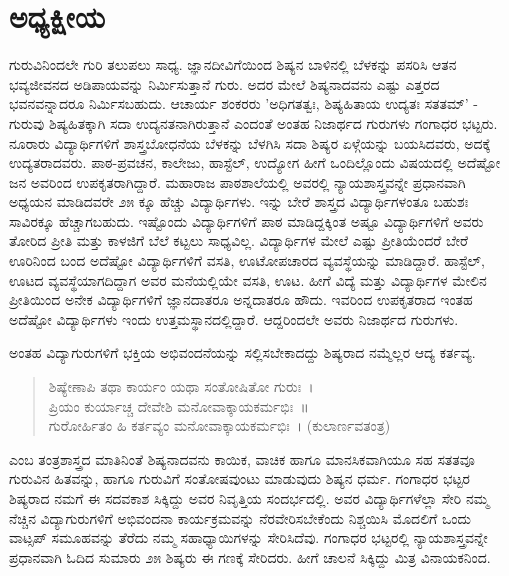 {\fontsize{14}{16}\selectfont
\chapter{ಅಧ್ಯಕ್ಷೀಯ}

ಗುರುವಿನಿಂದಲೇ ಗುರಿ ತಲುಪಲು ಸಾಧ್ಯ. ಜ್ಞಾನದೀವಿಗೆಯಿಂದ ಶಿಷ್ಯನ ಬಾಳಿನಲ್ಲಿ ಬೆಳಕನ್ನು ಪಸರಿಸಿ ಆತನ ಭವ್ಯಜೀವನದ ಅಡಿಪಾಯವನ್ನು ನಿರ್ಮಿಸುತ್ತಾನೆ ಗುರು. ಅದರ ಮೇಲೆ ಶಿಷ್ಯನಾದವನು ಎಷ್ಟು ಎತ್ತರದ ಭವನವನ್ನಾದರೂ ನಿರ್ಮಿಸಬಹುದು. ಆಚಾರ್ಯ ಶಂಕರರು ’ಅಧಿಗತತ್ವಃ, ಶಿಷ್ಯಹಿತಾಯ ಉದ್ಯತಃ ಸತತಮ್’ - ಗುರುವು ಶಿಷ್ಯಹಿತಕ್ಕಾಗಿ ಸದಾ ಉದ್ಯನತನಾಗಿರುತ್ತಾನೆ ಎಂದಂತೆ ಅಂತಹ ನಿಜಾರ್ಥದ ಗುರುಗಳು ಗಂಗಾಧರ ಭಟ್ಟರು. ನೂರಾರು ವಿದ್ಯಾರ್ಥಿಗಳಿಗೆ ಶಾಸ್ತ್ರಬೋಧನೆಯ ಬೆಳಕನ್ನು ಬೆಳಗಿಸಿ ಸದಾ ಶಿಷ್ಯರ ಏಳ್ಗೆಯನ್ನು ಬಯಸಿದವರು, ಅದಕ್ಕೆ ಉದ್ಯತರಾದವರು. ಪಾಠ-ಪ್ರವಚನ, ಕಾಲೇಜು, ಹಾಸ್ಟೆಲ್, ಉದ್ಯೋಗ ಹೀಗೆ ಒಂದಿಲ್ಲೊಂದು ವಿಷಯದಲ್ಲಿ ಅದೆಷ್ಟೋ ಜನ ಅವರಿಂದ ಉಪಕೃತರಾಗಿದ್ದಾರೆ. ಮಹಾರಾಜ ಪಾಠಶಾಲೆಯಲ್ಲಿ ಅವರಲ್ಲಿ ನ್ಯಾಯಶಾಸ್ತ್ರವನ್ನೇ ಪ್ರಧಾನವಾಗಿ ಅಧ್ಯಯನ ಮಾಡಿದವರೇ ೨೫ ಕ್ಕೂ ಹೆಚ್ಚು ವಿದ್ಯಾರ್ಥಿಗಳು. ಇನ್ನು ಬೇರೆ ಶಾಸ್ತ್ರದ ವಿದ್ಯಾರ್ಥಿಗಳಂತೂ ಬಹುಶಃ ಸಾವಿರಕ್ಕೂ ಹೆಚ್ಚಾಗಬಹುದು. ಇಷ್ಟೊಂದು ವಿದ್ಯಾರ್ಥಿಗಳಿಗೆ ಪಾಠ ಮಾಡಿದ್ದಕ್ಕಿಂತ ಅಷ್ಟೂ ವಿದ್ಯಾರ್ಥಿಗಳಿಗೆ ಅವರು ತೋರಿದ ಪ್ರೀತಿ ಮತ್ತು ಕಾಳಜಿಗೆ ಬೆಲೆ ಕಟ್ಟಲು ಸಾಧ್ಯವಿಲ್ಲ. ವಿದ್ಯಾರ್ಥಿಗಳ ಮೇಲೆ ಎಷ್ಟು ಪ್ರೀತಿಯೆಂದರೆ ಬೇರೆ ಊರಿನಿಂದ ಬಂದ ಅದೆಷ್ಟೋ ವಿದ್ಯಾರ್ಥಿಗಳಿಗೆ ವಸತಿ, ಊಟೋಪಚಾರದ ವ್ಯವಸ್ಥೆಯನ್ನು ಮಾಡಿದ್ದಾರೆ. ಹಾಸ್ಟೆಲ್, ಊಟದ ವ್ಯವಸ್ಥೆಯಾಗದಿದ್ದಾಗ ಅವರ ಮನೆಯಲ್ಲಿಯೇ ವಸತಿ, ಊಟ. ಹೀಗೆ ವಿದ್ಯೆ ಮತ್ತು ವಿದ್ಯಾರ್ಥಿಗಳ ಮೇಲಿನ ಪ್ರೀತಿಯಿಂದ ಅನೇಕ ವಿದ್ಯಾರ್ಥಿಗಳಿಗೆ ಜ್ಞಾನದಾತರೂ ಅನ್ನದಾತರೂ ಹೌದು. ಇವರಿಂದ ಉಪಕೃತರಾದ ಇಂತಹ ಅದೆಷ್ಟೋ ವಿದ್ಯಾರ್ಥಿಗಳು ಇಂದು ಉತ್ತಮಸ್ಥಾನದಲ್ಲಿದ್ದಾರೆ. ಆದ್ದರಿಂದಲೇ ಅವರು ನಿಜಾರ್ಥದ ಗುರುಗಳು.

ಅಂತಹ ವಿದ್ಯಾಗುರುಗಳಿಗೆ ಭಕ್ತಿಯ ಅಭಿವಂದನೆಯನ್ನು ಸಲ್ಲಿಸಬೇಕಾದದ್ದು ಶಿಷ್ಯರಾದ ನಮ್ಮೆಲ್ಲರ ಆದ್ಯ ಕರ್ತವ್ಯ.
\begin{verse}
ಶಿಷ್ಯೇಣಾಪಿ ತಥಾ ಕಾರ್ಯಂ ಯಥಾ ಸಂತೋಷಿತೋ ಗುರುಃ~।\\
ಪ್ರಿಯಂ ಕುರ್ಯಾಚ್ಚ ದೇವೇಶಿ ಮನೋವಾಕ್ಕಾಯಕರ್ಮಭಿಃ~॥\\
ಗುರೋರ್ಹಿತಂ ಹಿ ಕರ್ತವ್ಯಂ ಮನೋವಾಕ್ಕಾಯಕರ್ಮಭಿಃ~। (ಕುಲಾರ್ಣವತಂತ್ರ)
\end{verse}
ಎಂಬ ತಂತ್ರಶಾಸ್ತ್ರದ ಮಾತಿನಿಂತೆ ಶಿಷ್ಯನಾದವನು ಕಾಯಿಕ, ವಾಚಿಕ ಹಾಗೂ ಮಾನಸಿಕವಾಗಿಯೂ ಸಹ ಸತತವೂ ಗುರುವಿನ ಹಿತವನ್ನು, ಹಾಗೂ ಗುರುವಿಗೆ ಸಂತೋಷವುಂಟು ಮಾಡುವುದು ಶಿಷ್ಯನ ಧರ್ಮ. ಗಂಗಾಧರ ಭಟ್ಟರ ಶಿಷ್ಯರಾದ ನಮಗೆ ಈ ಸದವಕಾಶ ಸಿಕ್ಕಿದ್ದು ಅವರ ನಿವೃತ್ತಿಯ ಸಂದರ್ಭದಲ್ಲಿ. ಅವರ ವಿದ್ಯಾರ್ಥಿಗಳೆಲ್ಲಾ ಸೇರಿ ನಮ್ಮ ನೆಚ್ಚಿನ ವಿದ್ಯಾಗುರುಗಳಿಗೆ ಅಭಿವಂದನಾ ಕಾರ್ಯಕ್ರಮವನ್ನು ನೆರವೇರಿಸಬೇಕೆಂದು ನಿಶ್ಚಯಿಸಿ ಮೊದಲಿಗೆ ಒಂದು ವಾಟ್ಸಪ್ ಸಮೂಹವನ್ನು ತೆರೆದು ನಮ್ಮ ಸಹಾಧ್ಯಾಯಿಗಳನ್ನು ಸೇರಿಸಿದೆವು. ಗಂಗಾಧರ ಭಟ್ಟರಲ್ಲಿ ನ್ಯಾಯಶಾಸ್ತ್ರವನ್ನೇ ಪ್ರಧಾನವಾಗಿ ಓದಿದ ಸುಮಾರು ೨೫ ಶಿಷ್ಯರು ಈ ಗಣಕ್ಕೆ ಸೇರಿದರು. ಹೀಗೆ ಚಾಲನೆ ಸಿಕ್ಕಿದ್ದು ಮಿತ್ರ ವಿನಾಯಕನಿಂದ.

}
